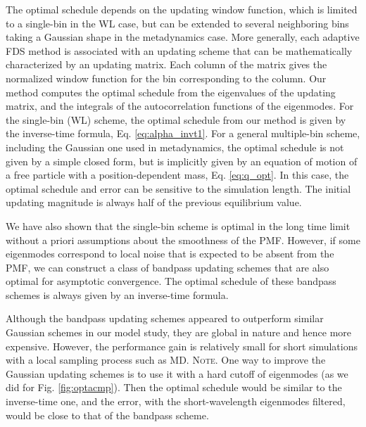 \documentclass[reprint, superscriptaddress, floatfix]{revtex4-1}
\newcommand{\note}[1]{{\color{DarkGreen}\footnotesize \textsc{Note.} #1}}
\begin{document}
The optimal schedule depends on the updating window function,
which is limited to a single-bin in the WL case,
but can be extended to several neighboring bins
taking a Gaussian shape in the metadynamics case.
%
More generally,
each adaptive FDS method is associated with
an updating scheme
that can be mathematically characterized
by an updating matrix.
%
Each column of the matrix gives the normalized
window function for the bin corresponding to the column.
%
Our method computes the optimal schedule from
the eigenvalues of the updating matrix,
and the integrals of the autocorrelation functions
of the eigenmodes.
%
For the single-bin (WL) scheme,
the optimal schedule from our method
is given by the inverse-time formula,
Eq. \eqref{eq:alpha_invt1}.
%
For a general multiple-bin scheme,
including the Gaussian one used in metadynamics,
the optimal schedule is not given by a simple closed form,
but is implicitly given by an equation of motion
of a free particle with a position-dependent mass, Eq. \eqref{eq:q_opt}.
%
In this case,
the optimal schedule and error
can be sensitive to the simulation length.
%
The initial updating magnitude is always
half of the previous equilibrium value.

We have also shown that
the single-bin scheme is optimal
in the long time limit
without a priori assumptions
about the smoothness of the PMF.
%
However, if some eigenmodes
correspond to local noise
that is expected to be absent from the PMF,
we can construct a
class of bandpass updating schemes
that are also optimal for asymptotic convergence.
%
The optimal schedule of these bandpass schemes
is always given by an inverse-time formula.

Although the bandpass updating schemes
appeared to outperform similar Gaussian schemes
in our model study,
they are global in nature
and hence more expensive.
%
However, the performance gain
is relatively small for short simulations
with a local sampling process such as MD.
%
\note{
One way to improve the Gaussian updating schemes
is to use it with a hard cutoff of eigenmodes
(as we did for Fig. \ref{fig:optacmp}).
%
Then the optimal schedule
would be similar to the inverse-time one,
and the error, with the short-wavelength eigenmodes filtered,
would be close to that of the bandpass scheme.
}
\end{document}
